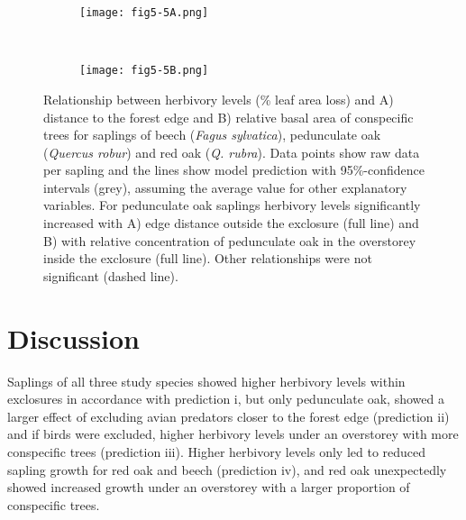 \documentclass[10pt, twoside]{book} %
\begin{document}
\begin{figure}[h!]
	\begin{center}
		\begin{subfigure}[c]{\textwidth}
			\texttt{[image: fig5-5A.png]}
		\end{subfigure}
		\\
		\begin{subfigure}[c]{\textwidth}
			\texttt{[image: fig5-5B.png]}
		\end{subfigure}
	\end{center}
	\caption{Relationship between herbivory levels (\% leaf area loss) and A) distance to the forest edge and B) relative basal area of conspecific trees for saplings of beech (\textit{Fagus sylvatica}), pedunculate oak (\textit{Quercus robur}) and red oak (\textit{Q. rubra}). Data points show raw data per sapling and the lines show model prediction with 95\%-confidence intervals (grey), assuming the average value for other explanatory variables. For pedunculate oak saplings herbivory levels significantly increased with A) edge distance outside the exclosure (full line) and B) with relative concentration of pedunculate oak in the overstorey inside the exclosure (full line). Other relationships were not significant (dashed line). \label{fig5-5}}
\end{figure}
\clearpage
	
	
	

	\section{Discussion}
	
	Saplings of all three study species showed higher herbivory levels within exclosures in accordance with prediction i, but only pedunculate oak, showed a larger effect of excluding avian predators closer to the forest edge (prediction ii) and if birds were excluded, higher herbivory levels under an overstorey with more conspecific trees (prediction iii). Higher herbivory levels only led to reduced sapling growth for red oak and beech (prediction iv), and red oak unexpectedly showed increased growth under an overstorey with a larger proportion of conspecific trees.\\
	
\end{document}
